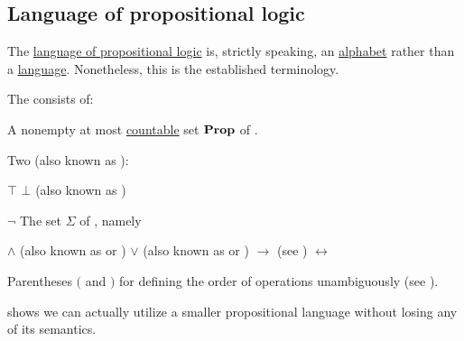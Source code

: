 \subsection{Language of propositional logic}\label{subsec:propositional_logic}

\begin{remark}\label{rem:propositional_language_is_alphabet}
  The \hyperref[def:propositional_language]{language of propositional logic} is, strictly speaking, an \hyperref[def:language/alphabet]{alphabet} rather than a \hyperref[def:language/language]{language}. Nonetheless, this is the established terminology.
\end{remark}

\begin{definition}\label{def:propositional_language}
  The  consists of:

  \begin{thmenum}
     A nonempty at most \hyperref[rem:cardinals/countable]{countable} set \( \operatorname{\mathbf{Prop}} \) of .

     Two  (also known as ):
    \begin{thmenum}
        \( \top \)
        \( \bot \) (also known as )
    \end{thmenum}

      \( \neg \)
     The set \( \Sigma \) of , namely
    \begin{thmenum}
        \( \wedge \) (also known as \hyperref[def:standard_boolean_operators]{} or \hyperref[def:lattice_operations]{})
        \( \vee \) (also known as \hyperref[def:standard_boolean_operators]{} or \hyperref[def:lattice_operations]{})
        \( \to \) (see )
        \( \leftrightarrow \)
    \end{thmenum}

     Parentheses \( ( \) and \( ) \) for defining the order of operations unambiguously (see ).
  \end{thmenum}

   shows we can actually utilize a smaller propositional language without losing any of its semantics.
\end{definition}

